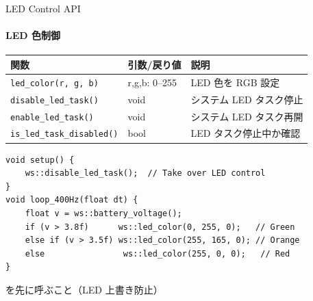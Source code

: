 \documentclass[aspectratio=169, 14pt]{beamer}
\begin{document}
\begin{frame}[fragile]{LED Control API}
  \framesubtitle{LED 色制御}
  {\small
  \begin{tabular}{lll}
    \hline
    \textbf{関数} & \textbf{引数/戻り値} & \textbf{説明} \\
    \hline
    \texttt{led\_color(r, g, b)}      & r,g,b: 0--255 & LED 色を RGB 設定 \\
    \texttt{disable\_led\_task()}     & void           & システム LED タスク停止 \\
    \texttt{enable\_led\_task()}      & void           & システム LED タスク再開 \\
    \texttt{is\_led\_task\_disabled()} & bool          & LED タスク停止中か確認 \\
    \hline
  \end{tabular}
  }

  \vspace{0.3em}

  \begin{lstlisting}[style=sfcpp, basicstyle=\ttfamily\scriptsize]
void setup() {
    ws::disable_led_task();  // Take over LED control
}
void loop_400Hz(float dt) {
    float v = ws::battery_voltage();
    if (v > 3.8f)      ws::led_color(0, 255, 0);   // Green
    else if (v > 3.5f) ws::led_color(255, 165, 0); // Orange
    else                ws::led_color(255, 0, 0);   // Red
}
  \end{lstlisting}

  \vspace{0.2em}
  {\footnotesize {}  を先に呼ぶこと（LED 上書き防止）}
\end{frame}
\end{document}
